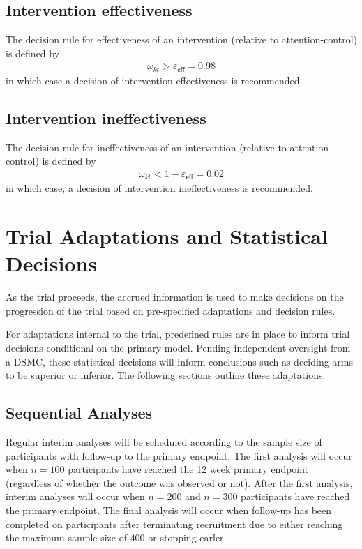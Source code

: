 \documentclass[11pt,parskip=half-]{scrartcl}
\begin{document}
\subsection{Intervention effectiveness}\label{intervention-effectiveness}

The decision rule for effectiveness of an intervention (relative to attention-control) is defined by
$$
  \begin{aligned}
    \omega_{kt} > \varepsilon_{\mathsf{eff}} = 0.98
  \end{aligned}
$$
in which case a decision of intervention effectiveness is recommended.

\subsection{Intervention ineffectiveness}\label{intervention-ineffectiveness}

The decision rule for ineffectiveness of an intervention (relative to attention-control) is defined by
$$
  \begin{aligned}
    \omega_{kt} < 1 - \varepsilon_{\mathsf{eff}} = 0.02
  \end{aligned}
$$
in which case, a decision of intervention ineffectiveness is recommended.

\clearpage

\section{Trial Adaptations and Statistical Decisions}\label{trial-adaptations-and-statistical-decisions}

As the trial proceeds, the accrued information is used to make decisions on the progression of the trial based on pre-specified adaptations and decision rules.

For adaptations internal to the trial, predefined rules are in place to inform trial decisions conditional on the primary model. Pending independent oversight from a DSMC, these statistical decisions will inform conclusions such as deciding arms to be superior or inferior. The following sections outline these adaptations.

\subsection{Sequential Analyses}\label{sequential-analyses}

Regular interim analyses will be scheduled according to the sample size of participants with follow-up to the primary endpoint. The first analysis will occur when \(n=100\) participants have reached the 12 week primary endpoint (regardless of whether the outcome was observed or not). After the first analysis, interim analyses will occur when $n=200$ and $n=300$ participants have reached the primary endpoint. The final analysis will occur when follow-up has been completed on participants after terminating recruitment due to either reaching the maximum sample size of \(400\) or stopping earler.
\end{document}
